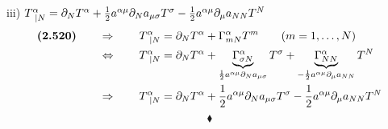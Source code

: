 iii) $T^{\alpha}_{\ |N} = \partial_{N}T^{\alpha}  + \frac{1}{2} a^{\alpha\mu} \partial_N a_{\mu\sigma}T^{\sigma} - \frac{1}{2} a^{\alpha\mu}  \partial_{\mu} a_{NN}T^{N}$\\
\begin{align}
\textbf{(2.520)}\quad\quad \Rightarrow \quad\quad T^{\alpha}_{\ |N} &= \partial_{N}T^{\alpha}+\Gamma^{\alpha}_{mN}T^m \quad\quad\text{(}m = 1,\dots,N \text{)}\\
\Leftrightarrow \quad\quad T^{\alpha}_{\ |N} &=  \partial_{N}T^{\alpha}+ \underbrace{\Gamma^{\alpha}_{\sigma N }}_{ \frac{1}{2} a^{\alpha \mu}\partial_N a_{\mu\sigma}}  T^{\sigma }+\underbrace{\Gamma^{\alpha}_{N N}}_{ -\frac{1}{2} a^{\alpha\mu}\partial_{\mu} a_{NN}}T^{N}\\
\Rightarrow \quad\quad T^{\alpha}_{\ |N} &=  \partial_{N}T^{\alpha}+ \frac{1}{2} a^{\alpha \mu}\partial_N a_{\mu\sigma}T^{\sigma } -\frac{1}{2} a^{\alpha\mu}\partial_{\mu} a_{NN}T^{N}
\end{align}
$$\blacklozenge$$
\newpage

